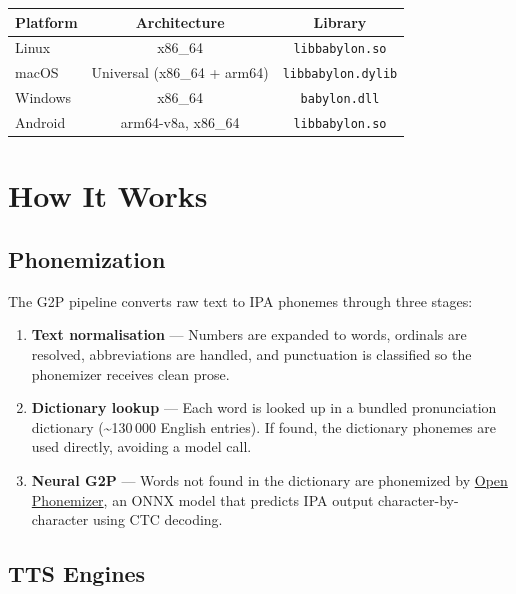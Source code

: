 \documentclass[12pt,a4paper]{article}
\begin{document}
\begin{center}
\begin{tabular}{lcc}
\toprule
\textbf{Platform} & \textbf{Architecture} & \textbf{Library} \\
\midrule
Linux   & x86\_64                     & \texttt{libbabylon.so} \\
macOS   & Universal (x86\_64 + arm64) & \texttt{libbabylon.dylib} \\
Windows & x86\_64                     & \texttt{babylon.dll} \\
Android & arm64-v8a, x86\_64          & \texttt{libbabylon.so} \\
\bottomrule
\end{tabular}
\end{center}

\section{How It Works}

\subsection{Phonemization}

The G2P pipeline converts raw text to IPA phonemes through three stages:

\begin{enumerate}
    \item \textbf{Text normalisation} — Numbers are expanded to words, ordinals are resolved, abbreviations are handled, and punctuation is classified so the phonemizer receives clean prose.
    \item \textbf{Dictionary lookup} — Each word is looked up in a bundled pronunciation dictionary (\textasciitilde130\,000 English entries). If found, the dictionary phonemes are used directly, avoiding a model call.
    \item \textbf{Neural G2P} — Words not found in the dictionary are phonemized by \href{https://github.com/NeuralVox/OpenPhonemizer}{Open Phonemizer}, an ONNX model that predicts IPA output character-by-character using CTC decoding.
\end{enumerate}

\subsection{TTS Engines}
\end{document}
